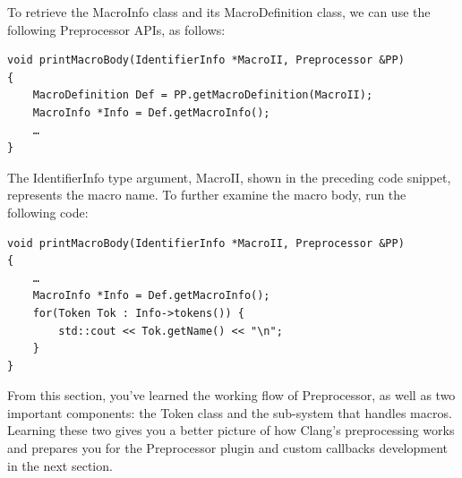 To retrieve the MacroInfo class and its MacroDefinition class, we can use the following Preprocessor APIs, as follows:

\begin{lstlisting}[style=styleCXX]
void printMacroBody(IdentifierInfo *MacroII, Preprocessor &PP)
{
	MacroDefinition Def = PP.getMacroDefinition(MacroII);
	MacroInfo *Info = Def.getMacroInfo();
	…
}
\end{lstlisting}

The IdentifierInfo type argument, MacroII, shown in the preceding code snippet, represents the macro name. To further examine the macro body, run the following code:

\begin{lstlisting}[style=styleCXX]
void printMacroBody(IdentifierInfo *MacroII, Preprocessor &PP)
{
	…
	MacroInfo *Info = Def.getMacroInfo();
	for(Token Tok : Info->tokens()) {
		std::cout << Tok.getName() << "\n";
	}
}
\end{lstlisting}

From this section, you've learned the working flow of Preprocessor, as well as two important components: the Token class and the sub-system that handles macros. Learning these two gives you a better picture of how Clang's preprocessing works and prepares you for the Preprocessor plugin and custom callbacks development in the next section.





























